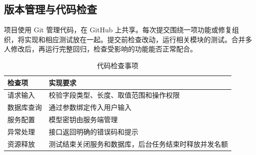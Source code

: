 \subsection*{版本管理与代码检查}
项目使用 Git 管理代码，在 GitHub 上共享。每次提交围绕一项功能或修复组织，将实现和相应测试放在一起。提交前检查改动，运行相关模块的测试。合并多人修改后，再运行完整回归，检查受影响的功能能否正常配合。

\begin{table}[H]\centering\small
\caption{代码检查事项}
\begin{tabularx}{\linewidth}{@{}p{28mm}X@{}}\toprule
检查项 & 实现要求 \\ \midrule
请求输入 & 校验字段类型、长度、取值范围和操作权限 \\
数据库查询 & 通过参数绑定传入用户输入 \\
服务配置 & 模型密钥由服务端管理 \\
异常处理 & 接口返回明确的错误码和提示 \\
资源释放 & 测试结束关闭服务和数据库，后台任务结束时释放并发名额 \\ \bottomrule
\end{tabularx}\end{table}
